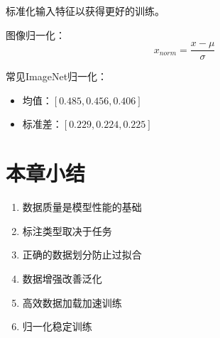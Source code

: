 标准化输入特征以获得更好的训练。

图像归一化：
\begin{equation}
x_{norm} = \frac{x - \mu}{\sigma}
\end{equation}

常见ImageNet归一化：
\begin{itemize}
    \item 均值：$[0.485, 0.456, 0.406]$
    \item 标准差：$[0.229, 0.224, 0.225]$
\end{itemize}

\section{本章小结}

\begin{enumerate}
    \item 数据质量是模型性能的基础
    \item 标注类型取决于任务
    \item 正确的数据划分防止过拟合
    \item 数据增强改善泛化
    \item 高效数据加载加速训练
    \item 归一化稳定训练
\end{enumerate}
